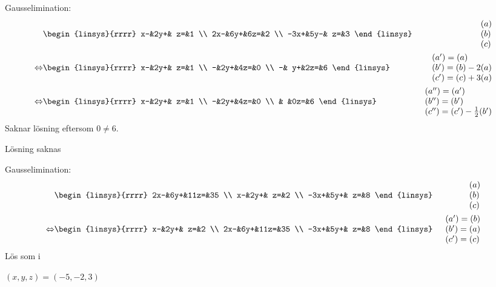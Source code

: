 \begin{task}{1.4}
	Gausselimination:
	\begin{align*}
		&\begin{linsys}{rrrr}
			  x-&2y+& z=&1 \\
			 2x-&6y+&6z=&2 \\
			-3x+&5y-& z=&3
		\end{linsys}
		&\begin{array}{l} 
			(a) \\ 
			(b) \\
			(c)
		\end{array} \\ \lra
		&\begin{linsys}{rrrr}
			x-&2y+& z=&1 \\
			 -&2y+&4z=&0 \\
			 -& y+&2z=&6
		\end{linsys}
		&\begin{array}{l} 
			(a')=(a) \\ 
			(b')=(b)-2(a) \\
			(c')=(c)+3(a)
		\end{array} \\ \lra
		&\begin{linsys}{rrrr}
			x-&2y+& z=&1 \\
			 -&2y+&4z=&0 \\
			  &   &0z=&6
		\end{linsys}
		&\begin{array}{l} 
			(a'')=(a') \\ 
			(b'')=(b') \\
			(c'')=(c')-\frac{1}{2}(b')
		\end{array}
	\end{align*}
	Saknar lösning eftersom $0\neq6$.
	
	\ans Lösning saknas
\end{task}

\begin{task}{1.5}
	Gausselimination:
	\begin{align*}
		&\begin{linsys}{rrrr}
			 2x-&6y+&11z=&35 \\
			  x-&2y+&  z=&2 \\
			-3x+&5y+&  z=&8
		\end{linsys}
		&\begin{array}{l} 
			(a) \\ 
			(b) \\
			(c)
		\end{array} \\ \lra
		&\begin{linsys}{rrrr}
		  x-&2y+&  z=&2 \\
		 2x-&6y+&11z=&35 \\
		-3x+&5y+&  z=&8
		\end{linsys}
		&\begin{array}{l} 
			(a')=(b) \\ 
			(b')=(a) \\
			(c')=(c)
		\end{array}
	\end{align*}
	Lös som i 
	
	\ans $(x,y,z)=(-5,-2,3)$
\end{task}

